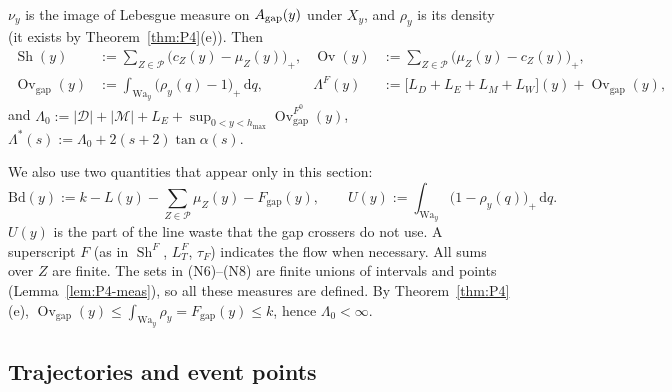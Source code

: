 \documentclass[11pt]{amsart}
\newcommand{\cP}{\mathcal P}
\newcommand{\cD}{\mathcal D}
\newcommand{\cM}{\mathcal M}
\newcommand{\Sh}{\operatorname{Sh}}
\newcommand{\Ov}{\operatorname{Ov}}
\newcommand{\Ovgap}{\operatorname{Ov}_{\mathrm{gap}}}
\newcommand{\Fgap}{F_{\mathrm{gap}}}
\newcommand{\hmax}{h_{\max}}
\newcommand{\Lam}{\Lambda}
\newcommand{\Fz}{F^{0}}
\newcommand{\dd}{\,\mathrm d}
\theoremstyle{definition}
\theoremstyle{remark}
\numberwithin{equation}{section}
\begin{document}
\begin{enumerate}[(N1)]
\begin{align*}
 \end{align*}
 $\nu_y$ is the image of Lebesgue measure on $A_{\rm gap}(y)$ under $X_y$, and $\rho_y$ is its density (it exists by Theorem~\ref{thm:P4}(e)). Then
 \begin{align*}
 \Sh(y)&:=\sum_{Z\in\cP}\big(c_Z(y)-\mu_Z(y)\big)_+, & \Ov(y)&:=\sum_{Z\in\cP}\big(\mu_Z(y)-c_Z(y)\big)_+,\\
 \Ovgap(y)&:=\int_{\mathrm{Wa}_y}\big(\rho_y(q)-1\big)_+\dd q, & \Lam^F(y)&:=\big[L_D+L_E+L_M+L_W\big](y)+\Ovgap(y),
 \end{align*}
 and $\Lam_0:=|\cD|+|\cM|+L_E+\sup_{0<y<\hmax}\Ovgap^{\Fz}(y)$, $\Lam^*(s):=\Lam_0+2(s+2)\tan\alpha(s)$.
\end{enumerate}
We also use two quantities that appear only in this section:
\begin{equation}\label{eq:P4-BdU}
\mathrm{Bd}(y):=k-L(y)-\sum_{Z\in\cP}\mu_Z(y)-\Fgap(y),\qquad U(y):=\int_{\mathrm{Wa}_y}\big(1-\rho_y(q)\big)_+\dd q .
\end{equation}
$U(y)$ is the part of the line waste that the gap crossers do not use. A superscript $F$ (as in $\Sh^F$, $L^F_T$, $\tau_F$) indicates the flow when necessary. All sums over $Z$ are finite. The sets in (N6)--(N8) are finite unions of intervals and points (Lemma~\ref{lem:P4-meas}), so all these measures are defined. By Theorem~\ref{thm:P4}(e), $\Ovgap(y)\le\int_{\mathrm{Wa}_y}\rho_y=\Fgap(y)\le k$, hence $\Lam_0<\infty$.

\subsection{Trajectories and event points}\label{ssec:P4-traj}
\end{document}
